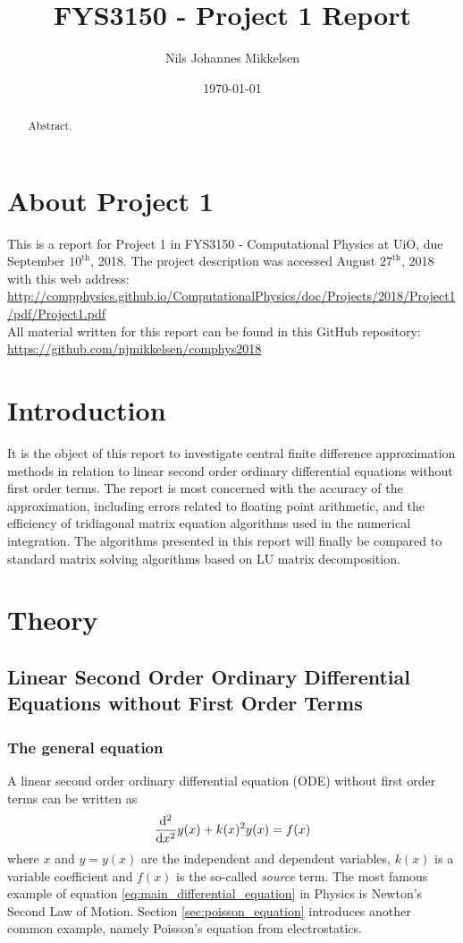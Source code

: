 \documentclass[reprint,english]{revtex4-1}
\begin{document}
\title{FYS3150 - Project 1 Report}
\author{Nils Johannes Mikkelsen}
\date{\today}
\noaffiliation
\begin{abstract}
Abstract.
\end{abstract}
\maketitle

\section*{About Project 1}
This is a report for Project 1 in FYS3150 - Computational Physics at UiO, due September \(10^{\text{th}}\), 2018. The project description was accessed August \(27^{\text{th}}\), 2018 with this web address:\\
{\scriptsize\url{http://compphysics.github.io/ComputationalPhysics/doc/Projects/2018/Project1/pdf/Project1.pdf}}\\
All material written for this report can be found in this GitHub repository:\\
{\scriptsize\url{https://github.com/njmikkelsen/comphys2018}}
\section{Introduction}
It is the object of this report to investigate central finite difference approximation methods in relation to linear second order ordinary differential equations without first order terms. The report is most concerned with the accuracy of the approximation, including errors related to floating point arithmetic, and the efficiency of tridiagonal matrix equation algorithms used in the numerical integration. The algorithms presented in this report will finally be compared to standard matrix solving algorithms based on LU matrix decomposition.
\section{Theory}
\subsection{Linear Second Order Ordinary Differential Equations without First Order Terms}
\subsubsection{The general equation}
A linear second order ordinary differential equation (ODE) without first order terms can be written as
\begin{equation}\label{eq:main_differential_equation}
\dv[2]{x}y(x)+k(x)^2y(x)=f(x)
\end{equation}
where \(x\) and \(y=y(x)\) are the independent and dependent variables, \(k(x)\) is a variable coefficient and \(f(x)\) is the so-called \emph{source} term. The most famous example of equation \eqref{eq:main_differential_equation} in Physics is Newton's Second Law of Motion. Section \ref{sec:poisson_equation} introduces another common example, namely Poisson's equation from electrostatics.
\end{document}
